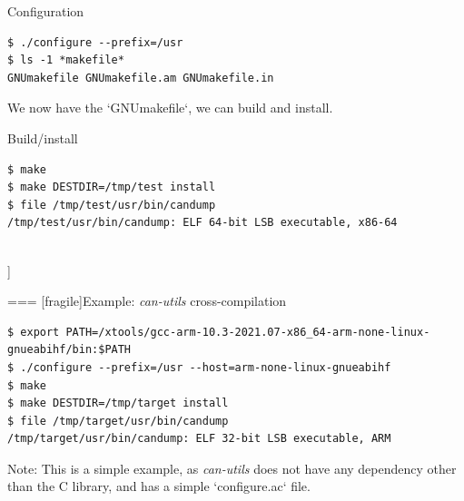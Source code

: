 
  \begin{block}{Configuration}
    {\tiny
\begin{verbatim}
$ ./configure --prefix=/usr
$ ls -1 *makefile*
GNUmakefile GNUmakefile.am GNUmakefile.in
\end{verbatim}
    }
  \end{block}

  {\small We now have the `GNUmakefile`, we can build and install.}

  \begin{block}{Build/install}
    {\tiny
\begin{verbatim}
$ make
$ make DESTDIR=/tmp/test install
$ file /tmp/test/usr/bin/candump
/tmp/test/usr/bin/candump: ELF 64-bit LSB executable, x86-64
\end{verbatim}
    }
  \end{block}

\\]


=== [fragile]{Example: {\em can-utils} cross-compilation}
  \begin{block}{}
    {\scriptsize
\begin{verbatim}
$ export PATH=/xtools/gcc-arm-10.3-2021.07-x86_64-arm-none-linux-gnueabihf/bin:$PATH
$ ./configure --prefix=/usr --host=arm-none-linux-gnueabihf
$ make
$ make DESTDIR=/tmp/target install
$ file /tmp/target/usr/bin/candump
/tmp/target/usr/bin/candump: ELF 32-bit LSB executable, ARM
\end{verbatim}
    }
    \end{block}

    Note: This is a simple example, as {\em can-utils} does not have
    any dependency other than the C library, and has a simple
    `configure.ac` file.


